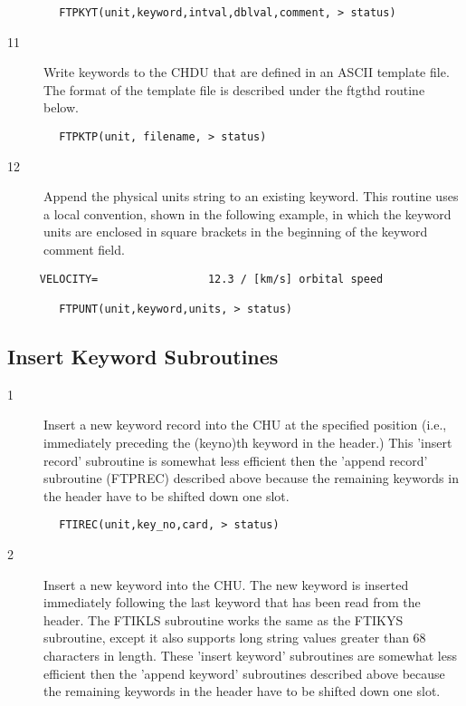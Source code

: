 \documentclass[11pt]{book}
\begin{document}
\begin{verbatim}
        FTPKYT(unit,keyword,intval,dblval,comment, > status)
\end{verbatim}

\begin{description}
\item[11] Write keywords to the CHDU that are defined in an ASCII template file.
   The format of the template file is described under the ftgthd
  routine below.
\end{description}

\begin{verbatim}
        FTPKTP(unit, filename, > status)
\end{verbatim}

\begin{description}
\item[12] Append the physical units string to an existing keyword.  This
    routine uses a local convention, shown in the following example,
    in which the keyword units are enclosed in square brackets in the
   beginning of the keyword comment field.
\end{description}


\begin{verbatim}
     VELOCITY=                 12.3 / [km/s] orbital speed

        FTPUNT(unit,keyword,units, > status)
\end{verbatim}

\subsection{Insert Keyword Subroutines \label{FTIREC}}


\begin{description}
\item[1 ] Insert a new keyword record into the CHU at the specified position
    (i.e., immediately preceding the (keyno)th keyword in the header.)
    This 'insert record' subroutine is somewhat less efficient
    then the 'append record' subroutine (FTPREC) described above because
   the remaining keywords in the header have to be shifted down one slot.
\end{description}

\begin{verbatim}
        FTIREC(unit,key_no,card, > status)
\end{verbatim}

\begin{description}
\item[2 ] Insert a new keyword into the CHU.  The new keyword is inserted
    immediately following the last keyword that has been read from the header.
    The FTIKLS subroutine works the same as the FTIKYS subroutine, except
    it also supports long string values greater than 68 characters in length.
    These 'insert keyword' subroutines are somewhat less efficient then
    the 'append keyword' subroutines described above because the remaining
   keywords in the header have to be shifted down one slot.
\end{description}
\end{document}
